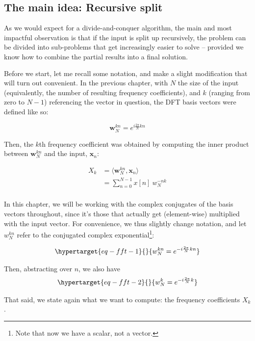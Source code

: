 \documentclass[
  letterpaper,
]{krantz}
\begin{document}
\hypertarget{the-main-idea-recursive-split}{%
\subsection{The main idea: Recursive
split}\label{the-main-idea-recursive-split}}

As we would expect for a divide-and-conquer algorithm, the main and most
impactful observation is that if the input is split up recursively, the
problem can be divided into sub-problems that get increasingly easier to
solve -- provided we know how to combine the partial results into a
final solution.

Before we start, let me recall some notation, and make a slight
modification that will turn out convenient. In the previous chapter,
with \(N\) the size of the input (equivalently, the number of resulting
frequency coefficients), and \(k\) (ranging from zero to \(N-1\))
referencing the vector in question, the DFT basis vectors were defined
like so:

\[
\mathbf{w}^{kn}_N = e^{i\frac{2 \pi}{N}k n}
\]

Then, the \(k\)th frequency coefficient was obtained by computing the
inner product between \(\mathbf{w}^{kn}_N\) and the input,
\(\mathbf{x}_n\):

\[
\begin{aligned}
X_k &= \langle \mathbf{w}^{kn}_N, \mathbf{x}_n \rangle \\ &= \sum_{n=0}^{N-1} x[n] \ w^{-nk}_N\\
\end{aligned}
\]

In this chapter, we will be working with the complex conjugates of the
basis vectors throughout, since it's those that actually get
(element-wise) multiplied with the input vector. For convenience, we
thus slightly change notation, and let \(w^{kn}_N\) refer to the
conjugated complex exponential\footnote{Note that now we have a scalar,
  not a vector.}:

\begin{equation}\protect\hypertarget{eq-fft-1}{}{
w^{kn}_N = e^{-i\frac{2 \pi}{N}k n}
}\label{eq-fft-1}\end{equation}

Then, abstracting over \(n\), we also have
\begin{equation}\protect\hypertarget{eq-fft-2}{}{
w^k_N = e^{-i\frac{2 \pi}{N}k}
}\label{eq-fft-2}\end{equation}

That said, we state again what we want to compute: the frequency
coefficients \(X_k\).
\end{document}

